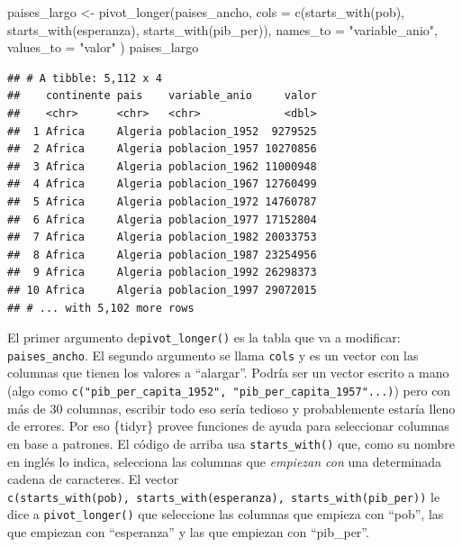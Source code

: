 \documentclass[
  openany]{book}
\newenvironment{Shaded}{\begin{snugshade}}{\end{snugshade}}
\newcommand{\AttributeTok}[1]{\textcolor[rgb]{0.77,0.63,0.00}{#1}}
\newcommand{\FunctionTok}[1]{\textcolor[rgb]{0.00,0.00,0.00}{#1}}
\newcommand{\NormalTok}[1]{#1}
\newcommand{\OtherTok}[1]{\textcolor[rgb]{0.56,0.35,0.01}{#1}}
\newcommand{\StringTok}[1]{\textcolor[rgb]{0.31,0.60,0.02}{#1}}
\begin{document}
\begin{Shaded}
\begin{Highlighting}[]
\NormalTok{paises\_largo }\OtherTok{\textless{}{-}} \FunctionTok{pivot\_longer}\NormalTok{(paises\_ancho,}
                             \AttributeTok{cols =} \FunctionTok{c}\NormalTok{(}\FunctionTok{starts\_with}\NormalTok{(}\StringTok{\textquotesingle{}pob\textquotesingle{}}\NormalTok{), }
                                      \FunctionTok{starts\_with}\NormalTok{(}\StringTok{\textquotesingle{}esperanza\textquotesingle{}}\NormalTok{), }
                                      \FunctionTok{starts\_with}\NormalTok{(}\StringTok{\textquotesingle{}pib\_per\textquotesingle{}}\NormalTok{)),}
                             \AttributeTok{names\_to =} \StringTok{"variable\_anio"}\NormalTok{, }
                             \AttributeTok{values\_to =} \StringTok{"valor"}
\NormalTok{)}
\NormalTok{paises\_largo}
\end{Highlighting}
\end{Shaded}

\begin{verbatim}
## # A tibble: 5,112 x 4
##    continente pais    variable_anio     valor
##    <chr>      <chr>   <chr>             <dbl>
##  1 Africa     Algeria poblacion_1952  9279525
##  2 Africa     Algeria poblacion_1957 10270856
##  3 Africa     Algeria poblacion_1962 11000948
##  4 Africa     Algeria poblacion_1967 12760499
##  5 Africa     Algeria poblacion_1972 14760787
##  6 Africa     Algeria poblacion_1977 17152804
##  7 Africa     Algeria poblacion_1982 20033753
##  8 Africa     Algeria poblacion_1987 23254956
##  9 Africa     Algeria poblacion_1992 26298373
## 10 Africa     Algeria poblacion_1997 29072015
## # ... with 5,102 more rows
\end{verbatim}

El primer argumento de\texttt{pivot\_longer()} es la tabla que va a modificar: \texttt{paises\_ancho}.
El segundo argumento se llama \texttt{cols} y es un vector con las columnas que tienen los valores a ``alargar''.
Podría ser un vector escrito a mano (algo como \texttt{c("pib\_per\_capita\_1952",\ "pib\_per\_capita\_1957"...)}) pero con más de 30 columnas, escribir todo eso sería tedioso y probablemente estaría lleno de errores.
Por eso \{tidyr\} provee funciones de ayuda para seleccionar columnas en base a patrones.
El código de arriba usa \texttt{starts\_with()} que, como su nombre en inglés lo indica, selecciona las columnas que \emph{empiezan con} una determinada cadena de caracteres.
El vector \texttt{c(starts\_with(\textquotesingle{}pob\textquotesingle{}),\ starts\_with(\textquotesingle{}esperanza\textquotesingle{}),\ starts\_with(\textquotesingle{}pib\_per\textquotesingle{}))} le dice a \texttt{pivot\_longer()} que seleccione las columnas que empieza con ``pob'', las que empiezan con ``esperanza'' y las que empiezan con ``pib\_per''.
\end{document}
